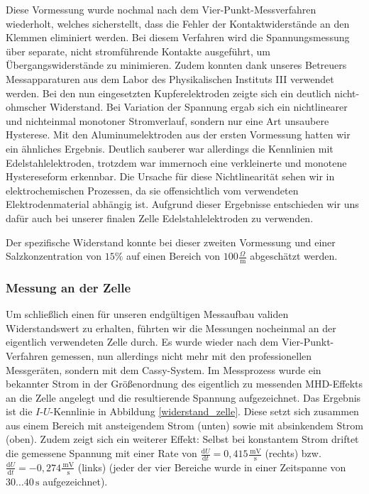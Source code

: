 \documentclass[11pt]{scrartcl}
\newcommand{\unit}[1]{\ensuremath{\,\mathrm{#1}}} %
\newcommand{\dif}{\ensuremath{\mathrm{d}}}
\begin{document}
Diese Vormessung wurde nochmal nach dem Vier-Punkt-Messverfahren wiederholt, welches sicherstellt, dass die Fehler der Kontaktwiderstände an den Klemmen eliminiert werden. Bei diesem Verfahren wird die Spannungsmessung über separate, nicht stromführende Kontakte ausgeführt, um Übergangswiderstände zu minimieren. Zudem konnten dank unseres Betreuers Messapparaturen aus dem Labor des Physikalischen Instituts III verwendet werden.
Bei den nun eingesetzten Kupferelektroden zeigte sich ein deutlich nicht-ohmscher Widerstand. Bei Variation der Spannung ergab sich ein nichtlinearer und nichteinmal monotoner Stromverlauf, sondern nur eine Art unsaubere Hysterese. Mit den Aluminumelektroden aus der ersten Vormessung hatten wir ein ähnliches Ergebnis. Deutlich sauberer war allerdings die Kennlinien mit Edelstahlelektroden, trotzdem war immernoch eine verkleinerte und monotene Hystereseform erkennbar. Die Ursache für diese Nichtlinearität sehen wir in elektrochemischen Prozessen, da sie offensichtlich vom verwendeten Elektrodenmaterial abhängig ist. Aufgrund dieser Ergebnisse entschieden wir uns dafür auch bei unserer finalen Zelle Edelstahlelektroden zu verwenden.

Der spezifische Widerstand konnte bei dieser zweiten Vormessung und einer Salzkonzentration von $15 \%$ auf einen Bereich von $100 \frac{\Omega}{\unit{m}}$ abgeschätzt werden. 

\subsubsection{Messung an der Zelle}
Um schließlich einen für unseren endgültigen Messaufbau validen Widerstandswert zu erhalten, führten wir die Messungen nocheinmal an der eigentlich verwendeten Zelle durch. Es wurde wieder nach dem Vier-Punkt-Verfahren gemessen, nun allerdings nicht mehr mit den professionellen Messgeräten, sondern mit dem Cassy-System. Im Messprozess wurde ein bekannter Strom in der Größenordnung des eigentlich zu messenden MHD-Effekts an die Zelle angelegt und die resultierende Spannung aufgezeichnet. Das Ergebnis ist die $I$-$U$-Kennlinie in Abbildung \ref{widerstand_zelle}. Diese setzt sich zusammen aus einem Bereich mit ansteigendem Strom (unten) sowie mit absinkendem Strom (oben). Zudem zeigt sich ein weiterer Effekt: Selbst bei konstantem Strom driftet die gemessene Spannung mit einer Rate von $\frac{\dif U}{\dif t} = 0,415 \frac{\unit{mV}}{\unit{s}}$ (rechts) bzw. $\frac{\dif U}{\dif t} = -0,274 \frac{\unit{mV}}{\unit{s}}$ (links) (jeder der vier Bereiche wurde in einer Zeitspanne von $30\ldots40 \unit{s}$ aufgezeichnet).
\end{document}
